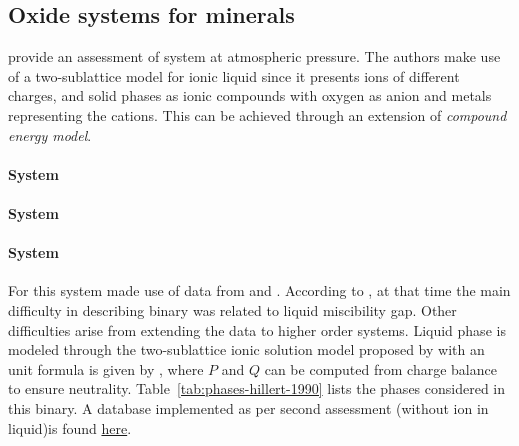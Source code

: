 \subsection{Oxide systems for minerals}

\textcite{Huang1995} provide an assessment of  system at atmospheric pressure. The authors make use of a two-sublattice model for ionic liquid since it presents ions of different charges, and solid phases as ionic compounds with oxygen as anion and metals representing the cations. This can be achieved through an extension of \emph{compound energy model}.

\paragraph{System }

\paragraph{System }

\paragraph{System } For this system \textcite{Huang1995} made use of data from \textcite{Hillert1990} and \textcite{Hillert1991}. According to \textcite{Hillert1990}, at that time the main difficulty in describing  binary was related to liquid miscibility gap. Other difficulties arise from extending the data to higher order systems. Liquid phase is modeled through the two-sublattice ionic solution model proposed by \textcite{Hillert1985} with an unit formula is given by , where $P$ and $Q$ can be computed from charge balance to ensure neutrality. Table~\ref{tab:phases-hillert-1990} lists the phases considered in this binary. A database implemented as per \textcite{Hillert1990} second assessment (without ion  in liquid)is found \href{https://github.com/WallyTutor/learning-scientific-computing/blob/main/databases/thermodynamics/hillert1990.tdb}{here}.


